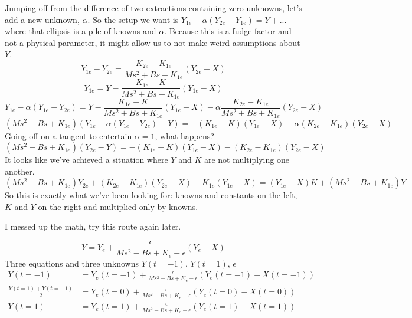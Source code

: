 \documentclass[10pt]{article}
\begin{document}
\newpage
Jumping off from the difference of two extractions containing zero unknowns, let's add a new unknown, $\alpha$. So the setup we want is $Y_{1e}-\alpha(Y_{2e}-Y_{1e})=Y+...$ where that ellipsis is a pile of knowns and $\alpha$. Because this is a fudge factor and not a physical parameter, it might allow us to not make weird assumptions about $Y$.
\begin{equation}
Y_{1e}-Y_{2e}=\frac{K_{2e}-K_{1e}}{Ms^2+Bs+K_{1e}}(Y_{2e}-X)
\end{equation}
\begin{equation}
Y_{1e}=Y-\frac{K_{1e}-K}{Ms^2+Bs+K_{1e}}(Y_{1e}-X)
\end{equation}
\begin{equation}
Y_{1e}-\alpha(Y_{1e}-Y_{2e})=Y-\frac{K_{1e}-K}{Ms^2+Bs+K_{1e}}(Y_{1e}-X)-\alpha\frac{K_{2e}-K_{1e}}{Ms^2+Bs+K_{1e}}(Y_{2e}-X)
\end{equation}
\begin{equation}
(Ms^2+Bs+K_{1e})(Y_{1e}-\alpha(Y_{1e}-Y_{2e})-Y)=-(K_{1e}-K)(Y_{1e}-X)-\alpha(K_{2e}-K_{1e})(Y_{2e}-X)
\end{equation}
Going off on a tangent to entertain $\alpha=1$, what happens?
\begin{equation}
(Ms^2+Bs+K_{1e})(Y_{2e}-Y)=-(K_{1e}-K)(Y_{1e}-X)-(K_{2e}-K_{1e})(Y_{2e}-X)
\end{equation}
It looks like we've achieved a situation where $Y$ and $K$ are not multiplying one another.
\begin{equation}
(Ms^2+Bs+K_{1e})Y_{2e}+(K_{2e}-K_{1e})(Y_{2e}-X)+K_{1e}(Y_{1e}-X)=(Y_{1e}-X)K+(Ms^2+Bs+K_{1e})Y
\end{equation}
So this is exactly what we've been looking for: knowns and constants on the left, $K$ and $Y$ on the right and multiplied only by knowns.

I messed up the math, try this route again later.



\newpage
\begin{equation}
Y=Y_e+\frac{\epsilon}{Ms^2-Bs+K_e-\epsilon}(Y_e-X)
\end{equation} 
Three equations and three unknowns $Y(t=-1)$, $Y(t=1)$, $\epsilon$
\begin{subequations}
\begin{align}
Y(t=-1)&=Y_e(t=-1)+\frac{\epsilon}{Ms^2-Bs+K_e-\epsilon}(Y_e(t=-1)-X(t=-1)) \\
\frac{Y(t=1)+Y(t=-1)}{2}&=Y_e(t=0)+\frac{\epsilon}{Ms^2-Bs+K_e-\epsilon}(Y_e(t=0)-X(t=0)) \\
Y(t=1)&=Y_e(t=1)+\frac{\epsilon}{Ms^2-Bs+K_e-\epsilon}(Y_e(t=1)-X(t=1))
\end{align}
\end{subequations}
\end{document}
